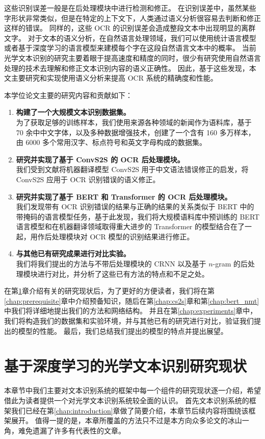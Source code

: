 这些识别误差一般是在后处理模块中进行检测和修正。
在识别误差中，虽然某些字形状非常类似，但是在特定的上下文下，人类通过语义分析很容易去判断和修正这样的错误。
同样的，这些 OCR 的识别误差会造成整段文本中出现明显的离群文字。
对于文本的语义分析，在自然语言处理领域，我们可以使用统计语言模型或者基于深度学习的语言模型来建模每个字在这段自然语言文本中的概率。
当前光学文本识别的研究主要着眼于提高速度和精度的同时，很少有研究使用自然语言处理的技术去理解和修正文本识别内容的语义正确性。
因此，基于这些发现，本文主要研究和实现使用语义分析来提高 OCR 系统的精确度和性能。

本学位论文主要的研究内容和贡献如下：

\begin{enumerate}[(1)]
	\item \textbf{构建了一个大规模文本识别数据集。} \\
	为了获取足够的训练样本，我们使用来源各种领域的新闻作为语料库，基于 70 余中中文字体，以及多种数据增强技术，创建了一个含有 160 多万样本，由 6000 多个常用汉字、标点符号和英文字母构成的数据集。
	\item \textbf{研究并实现了基于 ConvS2S 的 OCR 后处理模块。} \\
	我们受到文献\cite{NLPCC}将机器翻译模型 ConvS2S 用于中文语法错误修正的启发，将 ConvS2S 应用于 OCR 识别错误的语义修正。
	\item \textbf{研究并实现了基于 BERT 和 Transformer 的 OCR 后处理模块。} \\
	我们发现带有 OCR 识别错误的结果与正确的结果的关系类似于 BERT 中的带掩码的语言模型任务，基于此发现，我们将大规模语料库中预训练的 BERT 语言模型和在机器翻译领域取得重大进步的 Transformer 的模型结合在了一起，用作后处理模块对 OCR 模型的识别结果进行修正。
	\item \textbf{与其他已有研究成果进行对比实验。} \\
	我们将我们提出的方法与不带后处理模块的 CRNN 以及基于 $n$-gram 的后处理模块进行对比，并分析了这些已有方法的特点和不足之处。
\end{enumerate}

在第\ref{chap:related_work}章介绍有关的研究现状后，为了更好的方便读者，我们将在第\ref{chap:prerequisite}章中介绍预备知识，随后在第\ref{chap:cs2s}章和第\ref{chap:bert_nmt}中我们将详细地提出我们的方法和网络结构。
并且在第\ref{chap:experiments}章中，我们将构造我们的数据集和实验环境，并与其他已有的研究进行对比，验证我们提出的模型的性能。
最后，我们总结我们提出的模型的特点并提出展望。

\chapter{基于深度学习的光学文本识别研究现状}
\label{chap:related_work}
本章节中我们主要对文本识别系统的框架中每一个组件的研究现状逐一介绍，希望借此为读者提供一个对光学文本识别系统较全面的认识。
首先文本识别系统的框架我们已经在第\ref{chap:introduction}章做了简要介绍，本章节后续内容将围绕该框架展开。
值得一提的是，本章所覆盖的方法只不过是本方向众多论文的冰山一角，难免遗漏了许多有代表性的文章。


